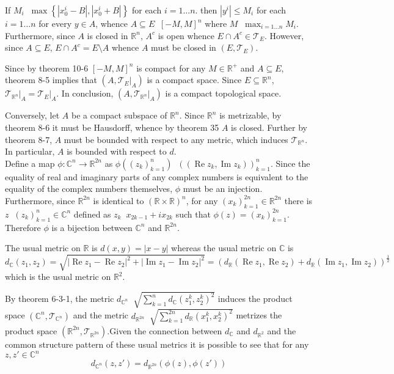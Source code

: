 \documentclass[a4paper]{article}
\newcommand{\obj}[1]{\left\{ #1 \right \}}
\newcommand{\clo}[1]{\left [ #1 \right ]}
\newcommand{\brac}[1]{\left ( #1 \right )}
\newcommand{\induc}[1]{\left . #1 \right \vert}
\newcommand{\abs}[1]{\left | #1 \right |}
\newcommand{\Real}{\mathbb{R}}
\newcommand{\Cplx}{\mathbb{C}}
\newcommand{\Tcal}{\mathcal{T}}
\newcommand{\defn}{\mathop{\overset{\Delta}{=}}\nolimits}
\newcommand{\re}{\operatorname{Re}\nolimits}
\newcommand{\im}{\operatorname{Im}\nolimits}
\begin{document}
If $M_i\defn \max\obj{\abs{x_0^i-B}, \abs{x_0^i+B}}$ for each $i=1\ldots n$.  then $\abs{y^i}\leq M_i$ for each $i=1\ldots n$ for every $y\in A$, whence $A\subseteq E\defn \clo{-M, M}^n$ where $M\defn \max_{i=1\ldots n} M_i$. Furthermore, since $A$ is closed in $\Real^n$, $A^c$ is open whence $E\cap A^c\in \Tcal_E$. However, since $A\subseteq E$, $E\cap A^c = E\setminus A$ whence $A$ must be closed in $\brac{E, \Tcal_E}$.

Since by theorem 10-6 $\clo{-M,M}^n$ is compact for any $M\in \Real^+$ and $A\subseteq E$, theorem 8-5 implies that $\brac{A, \induc{\Tcal_E}_A}$ is a compact space. Since $E\subseteq	\Real^n$, $\induc{\Tcal_{\Real^n}}_A = \induc{\Tcal_E}_A$. In conclusion, $\brac{A, \induc{\Tcal_{\Real^n}}_A}$ is a compact topological space.

Conversely, let $A$ be a compact subspace of $\Real^n$. Since $\Real^n$ is metrizable, by theorem 8-6 it must be Hausdorff, whence by theorem 35 $A$ is closed. Further by theorem 8-7, $A$ must be bounded with respect to any metric, which induces $\Tcal_{\Real^n}$. In particular, $A$ is bounded with respect to $d$.\\

Define a map $\phi:\Cplx^n \to \Real^{2n}$ as $\phi\brac{\brac{z_k}_{k=1}^n} \defn \brac{\brac{\re z_k, \im z_k}}_{k=1}^n$. Since the equality of real and imaginary parts of any complex numbers is equivalent to the equality of the complex numbers themselves, $\phi$ must be an injection. Furthermore, since $\Real^{2n}$ is identical to $\brac{\Real\times \Real}^n$, for any $\brac{x_k}_{k=1}^{2n} \in \Real^{2n}$ there is $z\defn\brac{z_k}_{k=1}^n \in \Cplx^n$ defined as $z_k \defn x_{2k-1} + i x_{2k}$ such that $\phi\brac{z}=\brac{x_k}_{k=1}^{2n}$. Therefore $\phi$ is a bijection between $\Cplx^n$ and $\Real^{2n}$.

The usual metric on $\Real$ is $d\brac{x,y} = \abs{x-y}$ whereas the usual metric on  $\Cplx$ is \[d_\Cplx\brac{z_1, z_2} = \sqrt{ \abs{\re z_1 - \re z_2 }^2 + \abs{ \im z_1 - \im z_2 }^2 } = \brac{ d_\Real\brac{\re z_1, \re z_2} + d_\Real\brac{\im z_1, \im z_2} }^\frac{1}{2}\] which is the usual metric on $\Real^2$.

By theorem 6-3-1, the metric $d_{\Cplx^n}\defn\sqrt{ \sum_{k=1}^n d_\Cplx\brac{z_1^k, z_2^k}^2 }$ induces the product space $\brac{\Cplx^n, \Tcal_{\Cplx^n}}$ and the metric $d_{\Real^{2n}}\defn\sqrt{ \sum_{k=1}^{2n} d_\Real\brac{x_1^k, x_2^k}^2 }$ metrizes the product space $\brac{\Real^{2n}, \Tcal_{\Real^{2n}}}$.Given the connection between $d_{\Cplx}$ and $d_{\Real^2}$ and the common structure pattern of these usual metrics it is possible to see that for any $z, z'\in \Cplx^n$ \[d_{\Cplx^n}\brac{z, z'} = d_{\Real^{2n}}\brac{ \phi\brac{z}, \phi\brac{z'} }\]
\end{document}
